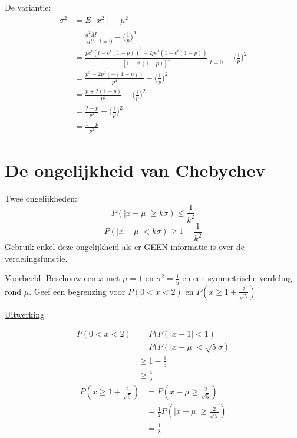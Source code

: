\documentclass[12pt]{report}
\newcommand{\example}[2]{
      \hrulefill
      
      Voorbeeld: #1
      
      \underline{Uitwerking}
      
      #2
      
      \hrulefill
  }
\begin{document}
{\begin{equation*}
\begin{split}
         \end{split}
        \end{equation*}
        De variantie:
        \begin{equation*}
         \begin{split}
          \sigma^2 & = E[x^2] - \mu^2 \\
                   & = \frac{d^2M}{dt^2}|_{t=0} - \bigg(\frac{1}{p}\bigg)^2 \\
                   & = \frac{pe^t(t - e^t(1 - p))^2 - 2pe^t(1 - e^t(1 - p))}{[1 - e^t(1 - p)]^4}\bigg|_{t = 0} - \bigg(\frac{1}{p}\bigg)^2 \\
                   & = \frac{p^3 - 2p^2(-(1-p))}{p^4} - \bigg(\frac{1}{p}\bigg)^2 \\
                   & = \frac{p + 2(1 - p)}{p^2} - \bigg(\frac{1}{p}\bigg)^2 \\
                   & = \frac{2 - p}{p^2} - \bigg(\frac{1}{p}\bigg)^2 \\
                & = \frac{1 - p}{p^2}
         \end{split}
        \end{equation*}

    }
\section{De ongelijkheid van Chebychev}
Twee ongelijkheden:
$$P(|x - \mu| \geq k\sigma) \leq \frac{1}{k^2}$$
$$P(|x - \mu| < k\sigma) \geq 1 - \frac{1}{k^2}$$
Gebruik enkel deze ongelijkheid als er GEEN informatie is over de verdelingsfunctie.
\example{
    Beschouw een $x$ met $\mu = 1$ en $\sigma^2 = \frac{1}{5}$ en  een symmetrische verdeling rond $\mu$.
    Geef een begrenzing voor $P(0 < x < 2)$ en $P(x \geq 1 + \frac{2}{\sqrt{5}})$
}{
    \begin{equation*}
     \begin{split}
      P(0 < x < 2) & = P(P(|x - 1| < 1) \\
                   & = P(P(|x - \mu| < \sqrt{5}\sigma) \\
                   & \geq 1 - \frac{1}{5} \\
                   & \geq \frac{4}{5}
     \end{split}
    \end{equation*}
    \begin{equation*}
     \begin{split}
      P(x \geq 1 + \frac{2}{\sqrt{5}}) & = P(x - \mu \geq \frac{2}{\sqrt{5}}) \\
                                       & = \frac{1}{2}P(|x - \mu| \geq \frac{2}{\sqrt{5}}) \\
                                       & = \frac{1}{8}
     \end{split}
    \end{equation*}
}
\end{document}

